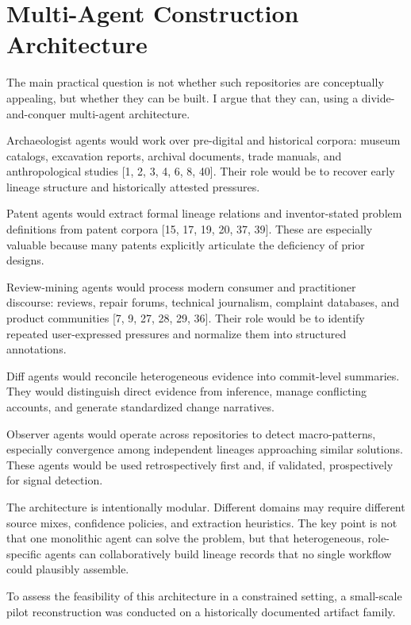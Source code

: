\section{Multi-Agent Construction Architecture}

The main practical question is not whether such repositories are conceptually appealing, but whether they can be built. I argue that they can, using a divide-and-conquer multi-agent architecture.

Archaeologist agents would work over pre-digital and historical corpora: museum catalogs, excavation reports, archival documents, trade manuals, and anthropological studies [1, 2, 3, 4, 6, 8, 40]. Their role would be to recover early lineage structure and historically attested pressures.

Patent agents would extract formal lineage relations and inventor-stated problem definitions from patent corpora [15, 17, 19, 20, 37, 39]. These are especially valuable because many patents explicitly articulate the deficiency of prior designs.

Review-mining agents would process modern consumer and practitioner discourse: reviews, repair forums, technical journalism, complaint databases, and product communities [7, 9, 27, 28, 29, 36]. Their role would be to identify repeated user-expressed pressures and normalize them into structured annotations.

Diff agents would reconcile heterogeneous evidence into commit-level summaries. They would distinguish direct evidence from inference, manage conflicting accounts, and generate standardized change narratives.

Observer agents would operate across repositories to detect macro-patterns, especially convergence among independent lineages approaching similar solutions. These agents would be used retrospectively first and, if validated, prospectively for signal detection.

The architecture is intentionally modular. Different domains may require different source mixes, confidence policies, and extraction heuristics. The key point is not that one monolithic agent can solve the problem, but that heterogeneous, role-specific agents can collaboratively build lineage records that no single workflow could plausibly assemble.

To assess the feasibility of this architecture in a constrained setting, a small-scale pilot reconstruction was conducted on a historically documented artifact family.
